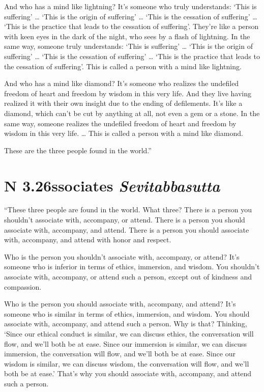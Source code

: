 \documentclass[12pt,openany]{book}%
\newcommand*{\suttatitleacronym}[1]{\smaller[2]{#1}\vspace*{.3em}}
\newcommand*{\suttatitletranslation}[1]{\linebreak{#1}}
\newcommand*{\suttatitleroot}[1]{\linebreak\smaller[2]\itshape{#1}}
\newcommand*{\tocacronym}[1]{\hspace*{-3.3em}{#1}\quad}
\newcommand*{\toctranslation}[1]{#1}
\newcommand*{\tocroot}[1]{(\textit{#1})}
\begin{document}
And who has a mind like lightning? It’s someone who truly understands: ‘This is suffering’ … ‘This is the origin of suffering’ … ‘This is the cessation of suffering’ … ‘This is the practice that leads to the cessation of suffering’. They’re like a person with keen eyes in the dark of the night, who sees by a flash of lightning. In the same way, someone truly understands: ‘This is suffering’ … ‘This is the origin of suffering’ … ‘This is the cessation of suffering’ … ‘This is the practice that leads to the cessation of suffering’. This is called a person with a mind like lightning. 

And who has a mind like diamond? It’s someone who realizes the undefiled freedom of heart and freedom by wisdom in this very life. And they live having realized it with their own insight due to the ending of defilements. It’s like a diamond, which can’t be cut by anything at all, not even a gem or a stone. In the same way, someone realizes the undefiled freedom of heart and freedom by wisdom in this very life. … This is called a person with a mind like diamond. 

These are the three people found in the world.” 

%
\section*{{\suttatitleacronym AN 3.26}{\suttatitletranslation Associates }{\suttatitleroot Sevitabbasutta}}
\addcontentsline{toc}{section}{\tocacronym{AN 3.26} \toctranslation{Associates } \tocroot{Sevitabbasutta}}

“These three people are found in the world. What three? There is a person you shouldn’t associate with, accompany, or attend. There is a person you should associate with, accompany, and attend. There is a person you should associate with, accompany, and attend with honor and respect. 

Who is the person you shouldn’t associate with, accompany, or attend? It’s someone who is inferior in terms of ethics, immersion, and wisdom. You shouldn’t associate with, accompany, or attend such a person, except out of kindness and compassion. 

Who is the person you should associate with, accompany, and attend? It’s someone who is similar in terms of ethics, immersion, and wisdom. You should associate with, accompany, and attend such a person. Why is that? Thinking, ‘Since our ethical conduct is similar, we can discuss ethics, the conversation will flow, and we’ll both be at ease. Since our immersion is similar, we can discuss immersion, the conversation will flow, and we’ll both be at ease. Since our wisdom is similar, we can discuss wisdom, the conversation will flow, and we’ll both be at ease.’ That’s why you should associate with, accompany, and attend such a person. 
\end{document}
